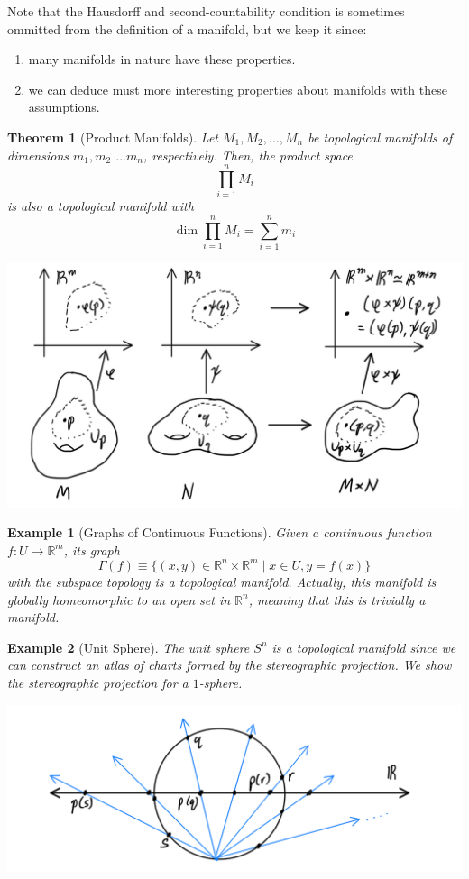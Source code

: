 \documentclass{article}
\newtheorem{theorem}{Theorem}[section]
\newtheorem{example}{Example}[section]
\theoremstyle{remark}
\theoremstyle{definition}
\begin{document}
Note that the Hausdorff and second-countability condition is sometimes ommitted from the definition of a manifold, but we keep it since: 
\begin{enumerate}
    \item many manifolds in nature have these properties. 
    \item we can deduce must more interesting properties about manifolds with these assumptions.
\end{enumerate}

\begin{theorem}[Product Manifolds]
Let $M_1, M_2, ..., M_n$ be topological manifolds of dimensions $m_1, m_2$ $...m_n$, respectively. Then, the product space 
\[\prod_{i=1}^n M_i\]
is also a topological manifold with 
\[\dim{\prod_{i=1}^n M_i} = \sum_{i=1}^n m_i \]
\begin{center}
    \includegraphics[scale=0.25]{img/Product_Manifolds.PNG}
\end{center}
\end{theorem}


\begin{example}[Graphs of Continuous Functions]
Given a continuous function $f: U \longrightarrow \mathbb{R}^m$, its graph
\[\Gamma (f) \equiv \{(x, y) \in \mathbb{R}^n \times \mathbb{R}^m \; | \;  x\in U, y = f(x)\}\]
with the subspace topology is a topological manifold. Actually, this manifold is \textit{globally homeomorphic} to an open set in $\mathbb{R}^n$, meaning that this is trivially a manifold. 
\end{example}

\begin{example}[Unit Sphere]
The unit sphere $S^n$ is a topological manifold since we can construct an atlas of charts formed by the stereographic projection. We show the stereographic projection for a $1$-sphere. 
\begin{center}
    \includegraphics[scale=0.25]{img/1_dim_Stereographic_Projection.PNG}
\end{center}
\end{example}
\end{document}

